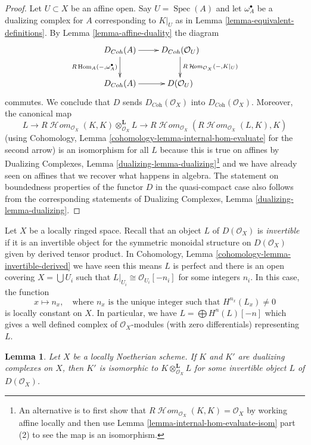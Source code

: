 \documentclass{stacks-project}
\theoremstyle{plain}
\newtheorem{lemma}[subsection]{Lemma}
\theoremstyle{definition}
\theoremstyle{remark}
\numberwithin{equation}{subsection}
\def\Spec{\mathop{\mathrm{Spec}}}
\def\Hom{\mathop{\mathrm{Hom}}\nolimits}
\def\SheafHom{\mathop{\mathcal{H}\!\mathit{om}}\nolimits}
\begin{document}
\begin{proof}
Let $U \subset X$ be an affine open. Say $U = \Spec(A)$ and
let $\omega_A^\bullet$ be a dualizing complex for $A$
corresponding to $K|_U$
as in Lemma \ref{lemma-equivalent-definitions}.
By Lemma \ref{lemma-affine-duality} the diagram
$$
\xymatrix{
D_{\textit{Coh}}(A) \ar[r] \ar[d]_{R\Hom_A(-, \omega_A^\bullet)} &
D_{\textit{Coh}}(\mathcal{O}_U) \ar[d]^{R\SheafHom_{\mathcal{O}_X}(-, K|_U)} \\
D_{\textit{Coh}}(A) \ar[r] &
D(\mathcal{O}_U)
}
$$
commutes. We conclude that $D$ sends $D_{\textit{Coh}}(\mathcal{O}_X)$ into
$D_{\textit{Coh}}(\mathcal{O}_X)$. Moreover, the canonical map
$$
L
\longrightarrow
R\SheafHom_{\mathcal{O}_X}(K, K) \otimes_{\mathcal{O}_X}^\mathbf{L} L
\longrightarrow
R\SheafHom_{\mathcal{O}_X}(R\SheafHom_{\mathcal{O}_X}(L, K), K)
$$
(using Cohomology, Lemma \ref{cohomology-lemma-internal-hom-evaluate}
for the second arrow)
is an isomorphism for all $L$ because this is true on affines by
Dualizing Complexes, Lemma \ref{dualizing-lemma-dualizing}\footnote{An
alternative is to first show that
$R\SheafHom_{\mathcal{O}_X}(K, K) = \mathcal{O}_X$ by
working affine locally and then use
Lemma \ref{lemma-internal-hom-evaluate-isom} part (2)
to see the map is an isomorphism.}
and we have already seen on affines that we recover what
happens in algebra.
The statement on boundedness properties of the functor $D$
in the quasi-compact case also follows from the corresponding
statements of Dualizing Complexes, Lemma \ref{dualizing-lemma-dualizing}.
\end{proof}

\noindent
Let $X$ be a locally ringed space. Recall that an object $L$ of
$D(\mathcal{O}_X)$ is {\it invertible} if it is an invertible object
for the symmetric monoidal structure on $D(\mathcal{O}_X)$ given
by derived tensor product. In
Cohomology, Lemma \ref{cohomology-lemma-invertible-derived}
we have seen this means $L$ is perfect and there is an open covering
$X = \bigcup U_i$ such that $L|_{U_i} \cong \mathcal{O}_{U_i}[-n_i]$
for some integers $n_i$. In this case, the function
$$
x \mapsto n_x,\quad
\text{where }n_x\text{ is the unique integer such that }
H^{n_x}(L_x) \not = 0
$$
is locally constant on $X$. In particular, we have
$L = \bigoplus H^n(L)[-n]$ which gives a well defined complex of
$\mathcal{O}_X$-modules (with zero differentials) representing $L$.

\begin{lemma}
\label{lemma-dualizing-unique-schemes}
Let $X$ be a locally Noetherian scheme. If $K$ and $K'$ are dualizing
complexes on $X$, then $K'$ is isomorphic to
$K \otimes_{\mathcal{O}_X}^\mathbf{L} L$
for some invertible object $L$ of $D(\mathcal{O}_X)$.
\end{lemma}
\end{document}
